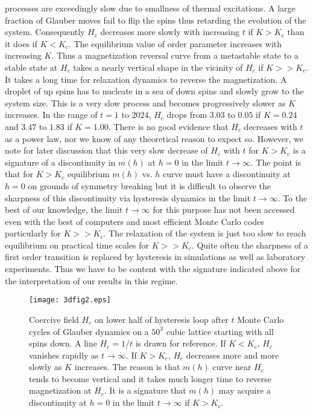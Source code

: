 \documentclass[a4,aps,amsmath,floatfix,nofootinbib,10pt]{revtex4}
\begin{document}
processes are exceedingly slow due to smallness of thermal excitations. 
A large fraction of Glauber moves fail to flip the spins thus retarding 
the evolution of the system. Consequently $H_c$ decreases more slowly 
with increasing $t$ if $K>K_c$ than it does if $K < K_c$. The 
equilibrium value of order parameter increases with increasing $K$. 
Thus a magnetization reversal curve from a metastable state to a stable 
state at $H_c$ takes a nearly vertical shape in the vicinity of $H_c$ 
if $K>>K_c$. It takes a long time for relaxation dynamics to reverse 
the magnetization. A droplet of up spins has to nucleate in a sea of 
down spins and slowly grow to the system size. This is a very slow 
process and becomes progressively slower as $K$ increases. In the range 
of $t=1$ to $2024$, $H_c$ drops from $3.03$ to $0.05$ if $K=0.24$ and 
$3.47$ to $1.83$ if $K=1.00$. There is no good evidence that $H_c$ 
decreases with $t$ as a power law, nor we know of any theoretical 
reason to expect so. However, we note for later discussion that this 
very slow decrease of $H_c$ with $t$ for $K > K_c$ is a signature of a 
discontinuity in $m(h)$ at $h=0$ in the limit $t \to \infty$. The point 
is that for $K > K_c$ equilibrium $m(h)$ vs. $h$ curve must have a 
discontinuity at $h=0$ on grounds of symmetry breaking but it is 
difficult to observe the sharpness of this discontinuity via hysteresis 
dynamics in the limit $t \to \infty$. To the best of our knowledge, the 
limit $t \to \infty$ for this purpose has not been accessed even with 
the best of computers and most efficient Monte Carlo codes particularly 
for $K >> K_c$. The relaxation of the system is just too slow to reach 
equilibrium on practical time scales for $K >> K_c$. Quite often the 
sharpness of a first order transition is replaced by hysteresis in 
simulations as well as laboratory experiments. Thus we have to be 
content with the signature indicated above for the interpretation of 
our results in this regime.


\begin{figure}[ht] 
\texttt{[image: 3dfig2.eps]} \caption { 
Coercive field $H_c$ on lower half of hysteresis loop after $t$ Monte 
Carlo cycles of Glauber dynamics on a $50^3$ cubic lattice starting 
with all spins down. A line $H_c=1/t$ is drawn for reference. If 
$K<K_c$, $H_c$ vanishes rapidly as $t \to \infty$. If $K > K_c$, $H_c$ 
decreases more and more slowly as $K$ increases. The reason is that 
$m(h)$ curve near $H_c$ tends to become vertical and it takes much 
longer time to reverse magnetization at $H_c$. It is a signature that 
$m(h)$ may acquire a discontinuity at $h=0$ in the limit $t \to \infty$ 
if $K > K_c$.} \label{fig2} \end{figure}
\end{document}
